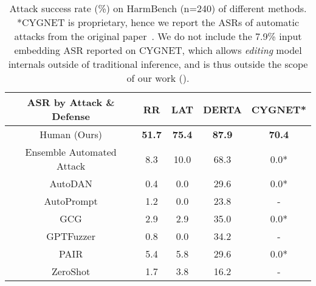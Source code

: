 \begin{table}[t!]
\centering
\begin{tabular}{|c|c|c|c|c|}
\hline

\textbf{ASR by Attack \& Defense} & \textbf{RR} & \textbf{LAT} & \textbf{DERTA} & \textbf{CYGNET}* \\
\hline
Human (Ours) & \textbf{51.7} & \textbf{75.4} & \textbf{87.9} & \textbf{70.4} \\
\hline
Ensemble Automated Attack & 8.3 & 10.0 & 68.3 & 0.0* \\
\hline
AutoDAN & 0.4 & 0.0 & 29.6 & 0.0* \\
\hline
AutoPrompt & 1.2 & 0.0 & 23.8 & - \\
\hline
GCG & 2.9 & 2.9 & 35.0 & 0.0* \\
\hline
GPTFuzzer & 0.8 & 0.0 & 34.2 & - \\
\hline
PAIR & 5.4 & 5.8 & 29.6 & 0.0*\\
\hline
ZeroShot & 1.7 & 3.8 & 16.2 & - \\
\hline
\end{tabular}
\caption{Attack success rate (\%) on HarmBench (n=240) of different methods. *CYGNET is proprietary, hence we report the ASRs of automatic attacks
from the original paper~\citep{zou2024improvingalignmentrobustnesscircuit}. We do not include the 7.9\% input embedding ASR reported on CYGNET, which allows \textit{editing} model internals outside of traditional inference, and is thus outside the scope of our work ().}
\label{tab:main_table}
\end{table}
